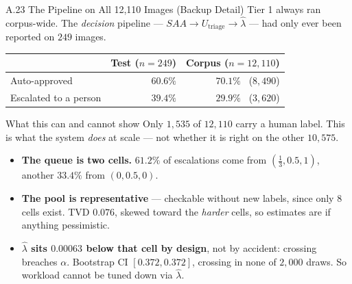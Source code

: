 \documentclass[aspectratio=169,11pt]{beamer}
\begin{document}
\begin{frame}{A.23 The Pipeline on All 12,110 Images (Backup Detail)}
\scriptsize
Tier 1 always ran corpus-wide. The \emph{decision} pipeline --- $SAA \rightarrow U_{\text{triage}} \rightarrow \hat\lambda$ --- had only ever been reported on $249$ images.
\vspace{1mm}
\begin{center}
\footnotesize
\begin{tabular}{@{}l r r@{}}
\toprule
& \textbf{Test ($n{=}249$)} & \textbf{Corpus ($n{=}12{,}110$)} \\
\midrule
Auto-approved & $60.6\%$ & $\mathbf{70.1\%}$ \ ($8{,}490$) \\
Escalated to a person & $39.4\%$ & $29.9\%$ \ ($3{,}620$) \\
\bottomrule
\end{tabular}
\end{center}
\vspace{-1mm}
\begin{alertblock}{\scriptsize What this can and cannot show}
\scriptsize Only $1{,}535$ of $12{,}110$ carry a human label. This is what the system \emph{does} at scale --- not whether it is right on the other $10{,}575$.
\end{alertblock}
\vspace{-1mm}
\begin{itemize}\scriptsize
  \setlength\itemsep{2pt}
  \item \textbf{The queue is two cells.} $61.2\%$ of escalations come from $(\tfrac13,0.5,1)$, another $33.4\%$ from $(0,0.5,0)$.
  \item \textbf{The pool is representative} --- checkable without new labels, since only 8 cells exist. TVD $\mathbf{0.076}$, skewed toward the \emph{harder} cells, so estimates are if anything pessimistic.
  \item \textbf{$\hat\lambda$ sits $0.00063$ below that cell by design}, not by accident: crossing breaches $\alpha$. Bootstrap CI $[0.372,0.372]$, crossing in none of $2{,}000$ draws. So workload cannot be tuned down via $\hat\lambda$.
\end{itemize}
\end{frame}
\end{document}
